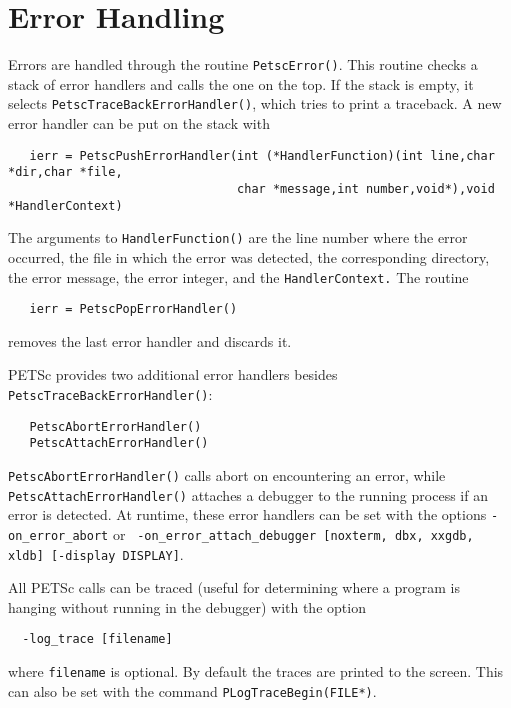 {\section{Error Handling}   

Errors are handled through the routine {\tt PetscError()}. 
 This routine
checks a stack of error handlers and calls the one on the top.  
If the stack is empty, it selects {\tt PetscTraceBackErrorHandler()}, 
which  tries to print a traceback. 
A new error handler can be put on the stack with
\begin{verbatim}
   ierr = PetscPushErrorHandler(int (*HandlerFunction)(int line,char *dir,char *file,
                                char *message,int number,void*),void *HandlerContext)
\end{verbatim}
The arguments to {\tt HandlerFunction()} are the line number where 
the error occurred, the file in which the error was detected, the corresponding
directory, the error message, the error integer, and the {\tt HandlerContext.}
The routine 
\begin{verbatim} 
   ierr = PetscPopErrorHandler()
\end{verbatim}
removes the last error handler and discards it. 

PETSc provides two additional error handlers besides 
{\tt PetscTraceBackErrorHandler()}:
 
\begin{verbatim}
   PetscAbortErrorHandler()
   PetscAttachErrorHandler()
\end{verbatim}
{\tt PetscAbortErrorHandler()} calls abort on encountering an error, while
{\tt PetscAttachErrorHandler()} attaches a debugger to the running process
if an error is detected. At runtime, these error handlers can be set
with the options {\tt -on\_error\_abort} or {\tt
-on\_error\_attach\_debugger [noxterm, dbx, xxgdb, xldb] [-display DISPLAY]}.

All PETSc calls can be traced (useful for determining where a program is 
hanging without running in the debugger) with the option
\begin{verbatim}
  -log_trace [filename]
\end{verbatim}
where {\tt filename} is optional. By default the traces are printed to the 
screen.  This can also be set with the 
command {\tt PLogTraceBegin(FILE*)}.  


}

